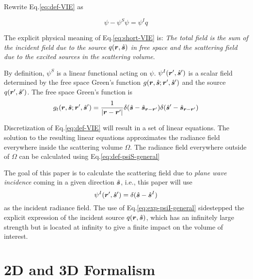 \documentclass [10pt,letterpaper]{article}
\newcommand{\unitvectorsym}[1]{\hat{\vectorsym{#1}}}
\begin{document}
Rewrite Eq.\eqref{eq:def-VIE} as

\begin{equation}\label{eq:short-VIE}
	\psi-\psi^S\psi=\psi^I q
\end{equation}

The explicit physical meaning of Eq.\eqref{eq:short-VIE} is: \emph{The total field is the sum of the incident field due to the source $q(\vectorsym{r},\unitvectorsym{s})$ in free space and the scattering field due to the excited sources in the scattering volume}.

By definition, $\psi^S$ is a linear functional acting on $\psi$. $\psi^I(\vectorsym{r}^\prime,\unitvectorsym{s}^\prime)$ is a scalar field determined by the free space Green's function $g(\vectorsym{r},\unitvectorsym{s};\vectorsym{r}^\prime,\unitvectorsym{s}^\prime)$ and the source $q(\vectorsym{r}^\prime,\unitvectorsym{s}^\prime)$.
The free space Green's function is
\begin{equation} \label{eq:exp-gf-general}
	g_t(\vectorsym{r},\unitvectorsym{s};\vectorsym{r}^\prime,\unitvectorsym{s}^\prime)
	=
	\frac
	{1}
	{\lvert \vectorsym{r}-\vectorsym{r}^\prime \rvert}
	\delta(\unitvectorsym{s}-\unitvectorsym{s}_{\vectorsym{r}-\vectorsym{r}^\prime})
	\delta(\unitvectorsym{s}^\prime-\unitvectorsym{s}_{\vectorsym{r}-\vectorsym{r}^\prime})
\end{equation}

Discretization of Eq.\eqref{eq:def-VIE} will result in a set of linear equations. The solution to the resulting linear equations approximates the radiance field everywhere inside the scattering volume
$\Omega$. The radiance field everywhere outside of $\Omega$ can be calculated using Eq.\eqref{eq:def-psiS-general}

The goal of this paper is to calculate the scattering field due to \emph{plane wave incidence} coming in a given direction $\unitvectorsym{s}$, i.e., this paper will use
\begin{equation}\label{eq:exp-psiI-general}
	\psi^I(\vectorsym{r}^\prime,\unitvectorsym{s}^\prime)=\delta(\unitvectorsym{s}-\unitvectorsym{s}^I)
\end{equation}
as the incident radiance field. The use of Eq.\eqref{eq:exp-psiI-general} sidestepped the explicit expression of the incident source $q(\vectorsym{r},\unitvectorsym{s})$, which has an infinitely large strength but is located at infinity to give a finite impact on the volume of interest.

\section{2D and 3D Formalism}
\label{sec:2d-and-3d-formalism}
\end{document}

